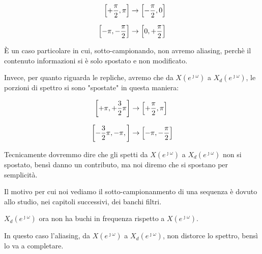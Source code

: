 {
    \Large 
    \begin{equation}
        \setlength{\jot}{10pt} %
        \begin{split}
            \left[ + \dfrac{\pi}{2}, \pi\right] &\to \left[ - \dfrac{\pi}{2}, 0\right] 
            \\
            \left[ - \pi, - \dfrac{\pi}{2}\right] &\to \left[ 0, + \dfrac{\pi}{2}\right] 
        \end{split}
    \end{equation}
}

È un caso particolare in cui, sotto-campionando, non avremo aliasing, perchè il contenuto informazioni si è solo spostato e non modificato. \newline 

Invece, per quanto riguarda le repliche, avremo che da $X \left(e^{\jmath \omega}\right)$ a $X_{d} \left(e^{\jmath \omega}\right)$, le porzioni di spettro si sono "spostate" in questa maniera:

{
    \Large 
    \begin{equation}
         \setlength{\jot}{10pt} %
        \begin{split}
            \left[ + \pi, +\dfrac{3}{2} \pi\right] &\to \left[ + \dfrac{\pi}{2}, \pi\right] 
            \\
            \left[ - \dfrac{3}{2} \pi, - \pi, \right] &\to \left[ - \pi, - \dfrac{\pi}{2}\right] 
        \end{split}
    \end{equation}
}

\begin{tcolorbox}
    Tecnicamente dovremmo dire che gli spetti da $X \left(e^{\jmath \omega}\right)$ a $X_{d} \left(e^{\jmath \omega}\right)$ non si spostato, bensì danno un contributo, ma noi diremo che si spostano per semplicità. \newline 

    Il motivo per cui noi vediamo il sotto-campionanmento di una sequenza è dovuto allo studio, nei capitoli successivi, dei banchi filtri. 
\end{tcolorbox}

$X_{d} \left(e^{\jmath \omega}\right)$ ora non ha buchi in frequenza rispetto a $X \left(e^{\jmath \omega}\right)$. \newline

In questo caso l'aliasing, da $X \left(e^{\jmath \omega}\right)$ a $X_{d} \left(e^{\jmath \omega}\right)$, non distorce lo spettro, bensì lo va a completare. \newline 


